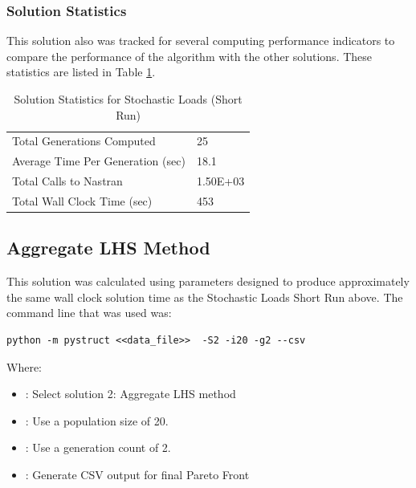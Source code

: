 \subsubsection{Solution Statistics}
This solution also was tracked for several computing performance indicators to compare the performance of the algorithm with the other solutions. These statistics are listed in Table \ref{tab:stat_sto_short}. 

\begin{table}[!htbp]
	\caption{Solution Statistics for Stochastic Loads (Short Run)}
  \label{tab:stat_sto_short}
  \centering
  \begin{tabular}{|l|l|}
    \hline
	  Total Generations Computed & 25\\
    Average Time Per Generation (sec) & 18.1\\
    Total Calls to Nastran & 1.50E+03\\
    Total Wall Clock Time (sec)	 & 453\\
    \hline
  \end{tabular}
\end{table}

\subsection{Aggregate LHS Method}
This solution was calculated using parameters designed to produce approximately the same wall clock solution time as the Stochastic Loads Short Run above. The command line that was used was:

\begin{verbatim}
python -m pystruct <<data_file>>  -S2 -i20 -g2 --csv
\end{verbatim}

\noindent Where: 

\begin{itemize}
  \item {}: Select solution 2: Aggregate LHS method
  \item {}: Use a population size of 20. 
  \item {}: Use a generation count of 2. 
  \item {}: Generate CSV output for final Pareto Front
\end{itemize}

